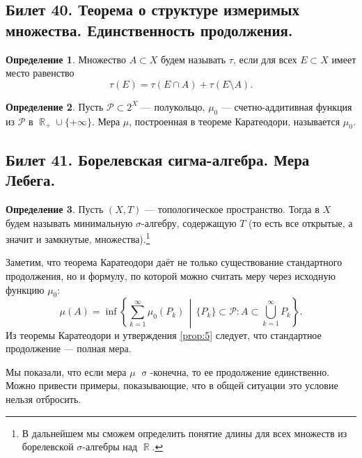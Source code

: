 \documentclass[a4paper]{article}
\theoremstyle{indented}
\theoremstyle{definition}
\newtheorem{defn}{Определение}
\theoremstyle{remark}
\DeclareMathOperator{\RR}{\mathbb{R}}
\DeclareMathOperator{\s}{\sigma}
\begin{document}
\subsection{Билет 40. Теорема о структуре измеримых множества. Единственность продолжения.}

\begin{defn}
	Множество $ A\subset X $ будем называть  $ \tau $, если для всех $ E\subset X $ имеет место равенство
	\begin{equation}\label{eq:6}
		\tau(E)=\tau(E\cap A)+\tau(E\setminus A).
	\end{equation}
\end{defn}

\begin{defn}
	Пусть $ \mathcal{P}\subset 2^X $ --- полукольцо, $ \mu_0 $ --- счетно-аддитивная функция из $ \mathcal{P} $ в $ \RR_+\cup\{+\infty\}. $ Мера $ \mu $, построенная в теореме Каратеодори, называется  $ \mu_0 $.
\end{defn}

\subsection{Билет 41. Борелевская сигма-алгебра. Мера Лебега.}



\begin{defn}
	Пусть $ (X,T) $ --- топологическое пространство. Тогда  в $ X $ будем называть минимальную $ \sigma $-алгебру, содержащую $ T $ (то есть все открытые, а значит и замкнутые, множества).\footnote{В дальнейшем мы сможем определить понятие длины для всех множеств из борелевской $ \sigma $-алгебры над $ \RR $.}
\end{defn}

Заметим, что теорема Каратеодори даёт не только существование стандартного продолжения, но и формулу, по которой можно считать меру через исходную функцию $ \mu_0 $:
\begin{equation*}
	\mu(A)=\inf\left\{\sum_{k=1}^{\infty}\mu_0(P_k)\,\middle|\,\{P_k\}\subset \mathcal{P} : A\subset \bigcup_{k=1}^{\infty}P_k\right\}.
\end{equation*}
Из теоремы Каратеодори и утверждения \ref{prop:5} следует, что стандартное продолжение --- полная мера.

Мы показали, что если мера $\mu $  $\s$-конечна, то ее продолжение единственно. Можно привести примеры, показывающие, что в общей ситуации это условие нельзя отбросить.
\end{document}
